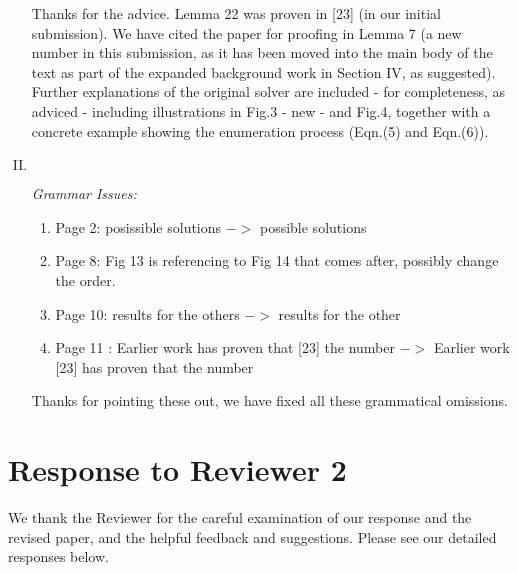 \documentclass[11pt]{article}
\newenvironment{reviewer}
{\begin{mdframed}[roundcorner = 10pt,fontcolor=blue!70!black]\itshape}
{\end{mdframed}}
\begin{document}
\begin{enumerate}[I.]
\noindent
Thanks for the advice. 
Lemma 22 was proven in [23] (in our initial submission). 
We have cited the paper for proofing in Lemma 7 (a new number in this submission, as it has been moved into the main body of the text as part of the expanded background work in Section IV, as suggested). Further explanations of the original solver are included - for completeness, as adviced -  including illustrations in Fig.3 - new - and  Fig.4, together with a concrete example showing the enumeration process (Eqn.(5) and Eqn.(6)). 
  
  \item $ $
  \begin{reviewer}
    Grammar Issues: 
\begin{enumerate}
\item  Page 2: posissible solutions $->$ possible  solutions
\item  Page 8: Fig 13 is referencing to Fig 14 that comes after, possibly change the order.
\item  Page 10: results for the others $->$ results for the other
\item  Page 11 : Earlier work has proven that [23] the number $->$ Earlier work [23] has proven that the number
\end{enumerate}
  \end{reviewer}

\noindent
Thanks for pointing these out, we have fixed all these grammatical omissions. 
  
\end{enumerate}

\clearpage

\section*{Response to Reviewer 2}
We thank the Reviewer for the careful examination of our response and the revised paper, and the helpful feedback and suggestions. Please see our detailed responses below.
\end{document}

